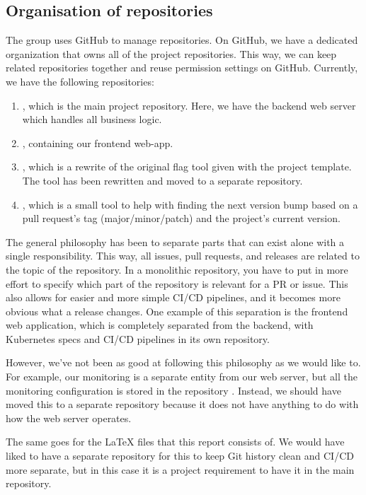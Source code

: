 \subsection{Organisation of repositories}
The group uses GitHub to manage repositories. On GitHub, we have a dedicated organization that owns all of the project repositories. This way, we can keep related repositories together and reuse permission settings on GitHub. Currently, we have the following repositories:
\begin{enumerate}
  \item \href{https://github.com/Devops-2022-Group-R/itu-minitwit}{}, which is the main project repository. Here, we have the backend web server which handles all business logic.
  \item \href{https://github.com/Devops-2022-Group-R/itu-minitwit-frontend}{}, containing our frontend web-app.
  \item \href{https://github.com/Devops-2022-Group-R/flag-tool}{}, which is a rewrite of the original flag tool given with the project template. The tool has been rewritten and moved to a separate repository.
  \item \href{https://github.com/Devops-2022-Group-R/bump-tool}{}, which is a small tool to help with finding the next version bump based on a pull request's tag (major/minor/patch) and the project's current version.
\end{enumerate}
The general philosophy has been to separate parts that can exist alone with a single responsibility. This way, all issues, pull requests, and releases are related to the topic of the repository. In a monolithic repository, you have to put in more effort to specify which part of the repository is relevant for a PR or issue. This also allows for easier and more simple CI/CD pipelines, and it becomes more obvious what a release changes. One example of this separation is the frontend web application, which is completely separated from the backend, with Kubernetes specs and CI/CD pipelines in its own repository.

However, we've not been as good at following this philosophy as we would like to. For example, our monitoring is a separate entity from our web server, but all the monitoring configuration is stored in the  repository \cite{repo:monitoring-config} \cite{repo:monitoring-kubernetes}. Instead, we should have moved this to a separate repository because it does not have anything to do with how the web server operates.

The same goes for the LaTeX files that this report consists of. We would have liked to have a separate repository for this to keep Git history clean and CI/CD more separate, but in this case it is a project requirement to have it in the main repository.
